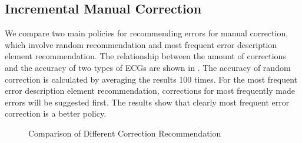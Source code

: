 \subsection{Incremental Manual Correction}
We compare two main policies for recommending errors for manual correction, 
which involve random recommendation and most frequent error 
description element recommendation. The relationship between the 
amount of corrections and the accuracy of two types of 
ECGs are shown in . 
The accuracy of random correction is calculated by averaging 
the results 100 times. For the most frequent error 
description element recommendation, 
corrections for most frequently made errors will be suggested first. 
The results show that clearly most frequent error correction is
a better policy. 

\begin{figure}[th]
\centering
{}
\hfill
{}
\caption{Comparison of Different Correction Recommendation}
\label{fig:humancorr}
\end{figure}




